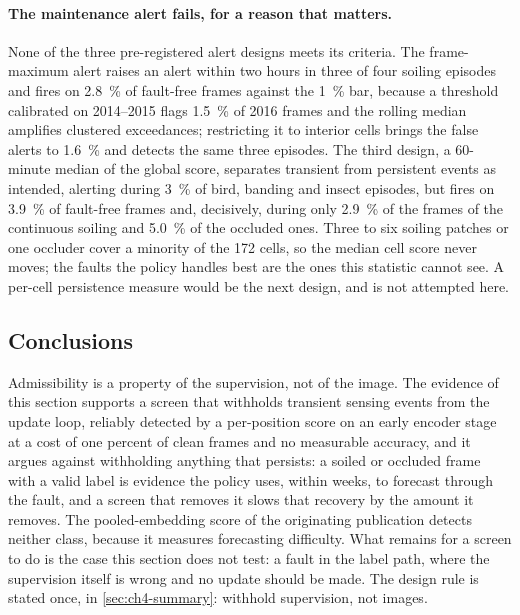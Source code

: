 \paragraph{The maintenance alert fails, for a reason that matters.} None of the three pre-registered alert designs meets its criteria. The frame-maximum alert raises an alert within two hours in three of four soiling episodes and fires on \SI{2.8}{\percent} of fault-free frames against the \SI{1}{\percent} bar, because a threshold calibrated on 2014--2015 flags \SI{1.5}{\percent} of 2016 frames and the rolling median amplifies clustered exceedances; restricting it to interior cells brings the false alerts to \SI{1.6}{\percent} and detects the same three episodes. The third design, a 60-minute median of the global score, separates transient from persistent events as intended, alerting during \SI{3}{\percent} of bird, banding and insect episodes, but fires on \SI{3.9}{\percent} of fault-free frames and, decisively, during only \SI{2.9}{\percent} of the frames of the continuous soiling and \SI{5.0}{\percent} of the occluded ones. Three to six soiling patches or one occluder cover a minority of the 172 cells, so the median cell score never moves; the faults the policy handles best are the ones this statistic cannot see. A per-cell persistence measure would be the next design, and is not attempted here.

\subsection{Conclusions}
\label{sec:ch4-admissibility-conclusions}
Admissibility is a property of the supervision, not of the image. The evidence of this section supports a screen that withholds transient sensing events from the update loop, reliably detected by a per-position score on an early encoder stage at a cost of one percent of clean frames and no measurable accuracy, and it argues against withholding anything that persists: a soiled or occluded frame with a valid label is evidence the policy uses, within weeks, to forecast through the fault, and a screen that removes it slows that recovery by the amount it removes. The pooled-embedding score of the originating publication detects neither class, because it measures forecasting difficulty. What remains for a screen to do is the case this section does not test: a fault in the label path, where the supervision itself is wrong and no update should be made. The design rule is stated once, in \cref{sec:ch4-summary}: withhold supervision, not images.

